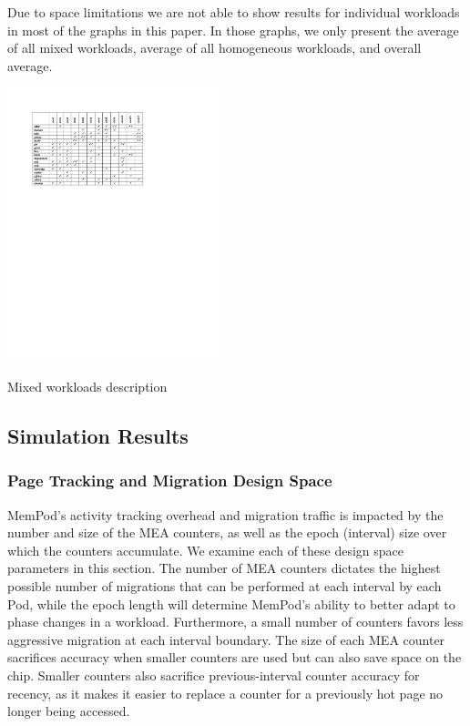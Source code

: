 Due to space limitations we are not able to show results for individual workloads in most of the graphs in this paper. In those graphs, we only present the average of all mixed workloads, average of all homogeneous workloads, and overall average.

\begin{table}
  \includegraphics[width=0.46\textwidth]{figures/workloads_checkmarks.pdf}
  \caption{Mixed workloads description}
  \label{tab:workloads}
\end{table}

\subsection{Simulation Results}
\label{sub:SimResults}

\subsubsection{Page Tracking and Migration Design Space}

MemPod's activity tracking overhead and migration traffic is impacted by
the number and size of the MEA counters, as well as the epoch (interval) 
size over
which the counters accumulate.  We examine each of these design space
parameters in this section.
The number of MEA counters dictates the highest possible number of 
migrations that can be performed at each interval by each Pod, while the epoch length will determine MemPod's ability to better adapt to phase changes in a workload. Furthermore, a small number of counters favors less aggressive
migration at each interval boundary.
The size of each MEA counter sacrifices accuracy when smaller counters are 
used 
but can also save space on the chip.  Smaller counters also sacrifice
previous-interval counter accuracy for recency, as it makes it easier to
replace a counter for a previously hot page no longer being accessed.

